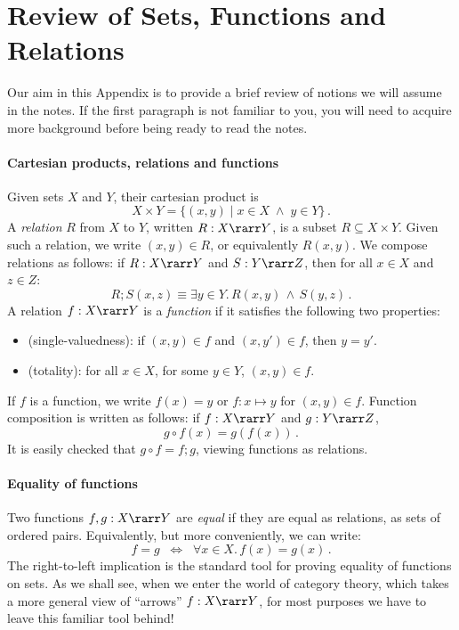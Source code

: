 \documentclass[12pt]{article}
\begin{document}

\appendix

\section{Review of Sets, Functions and Relations}
Our aim in this Appendix is to provide a brief review of notions we will assume in the notes. If the first paragraph is not familiar to you, you  will need to acquire more background before being ready to read the notes.

\paragraph{Cartesian products, relations and functions}
Given sets $X$ and $Y$, their cartesian product is
\[ X \times Y = \{ (x, y) \mid x \in X \; \wedge \; y \in Y \} \, . \]
A \emph{relation} $R$ from $X$ to $Y$, written $R : X \rarr Y$, is a subset $R \subseteq X \times Y$. Given such a relation, we write $(x, y) \in R$, or equivalently $R(x, y)$. We  compose relations as follows: if $R : X \rarr Y$ and $S : Y \rarr Z$, then for all $x \in X$ and $z \in Z$:
\[ R; S (x, z) \equiv \exists y \in Y. \, R(x,y) \, \wedge \, S(y,z) \, . \]
A relation $f : X \rarr Y$ is a \emph{function} if it satisfies the following two properties:
\begin{itemize}
\item (single-valuedness): if  $(x, y) \in f$ and $(x, y') \in f$, then $y = y'$.
\item (totality): for all $x \in X$, for some $y \in Y$, $(x, y) \in f$.
\end{itemize}
If $f$ is  a function, we write $f(x) = y$ or $f: x \mapsto y$ for $(x, y) \in f$. Function composition is written as follows: if $f : X \rarr Y$ and $g : Y \rarr Z$,
\[ g \circ f (x) = g(f(x)) \, . \]
It is easily checked that $g \circ f = f;g$, viewing functions as relations.

\paragraph{Equality of functions}
Two functions $f, g : X \rarr Y$ are \emph{equal} if they are equal as relations, \ie as sets of ordered pairs. Equivalently, but more conveniently, we can write:
\[ f = g \;\; \Longleftrightarrow \;\; \forall x \in X. \, f(x) = g(x) \, . \]
The right-to-left implication is the standard tool for proving equality of functions on sets. As we shall see, when we enter the world of category theory, which takes a more general view of ``arrows'' $f : X \rarr Y$, for most purposes we have to leave this familiar tool behind!
\end{document}
